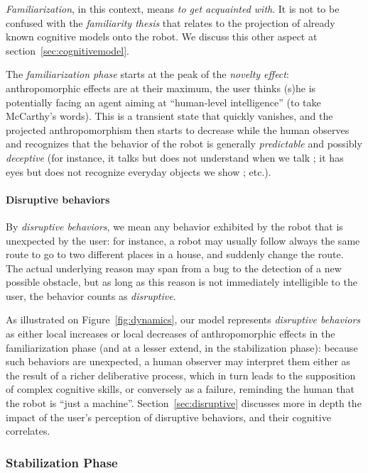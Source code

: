 \documentclass{frontiersSCNS} %
\begin{document}
\emph{Familiarization}, in this context, means \emph{to get acquainted with}.
It is not to be confused with the \emph{familiarity thesis} that relates to the
projection of already known cognitive models onto the robot. We discuss this other
aspect at section~\ref{sec:cognitivemodel}.

The \emph{familiarization phase} starts at the peak of the \emph{novelty
effect}: anthropomorphic effects are at their maximum, the user thinks (s)he is
potentially facing an agent aiming at ``human-level intelligence'' (to take
McCarthy's words). This is a transient state that quickly vanishes, and the
projected anthropomorphism then starts to decrease while the human observes and
recognizes that the behavior of the robot is generally \emph{predictable} and
possibly \emph{deceptive} (for instance, it talks but does not understand when
we talk ; it has eyes but does not recognize everyday objects we show ; etc.).

\paragraph{Disruptive behaviors}

By \emph{disruptive behaviors}, we mean any behavior exhibited by the robot that
is unexpected by the user: for instance, a robot may usually follow always the
same route to go to two different places in a house, and suddenly change the
route. The actual underlying reason may span from a bug to the detection of a
new possible obstacle, but as long as this reason is not immediately
intelligible to the user, the behavior counts as \emph{disruptive}.

As illustrated on Figure~\ref{fig:dynamics}, our model represents
\emph{disruptive behaviors} as either local increases or local decreases of
anthropomorphic effects in the familiarization phase (and at a lesser extend, in
the stabilization phase): because such behaviors are unexpected, a human
observer may interpret them either as the result of a richer deliberative
process, which in turn leads to the supposition of complex cognitive skills, or
conversely as a failure, reminding the human that the robot is ``just a
machine''. Section~\ref{sec:disruptive} discusses more in depth the impact of
the user's perception of disruptive behaviors, and their cognitive correlates.

\subsubsection{Stabilization Phase}
\label{sec:stabilization}
\end{document}
